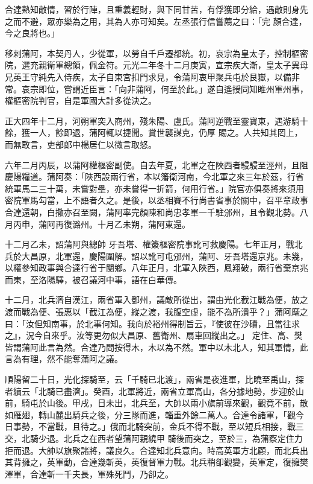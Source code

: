\begin{pinyinscope}
 合達熟知敵情，習於行陣，且重義輕財，與下同甘苦，有俘獲即分給，遇敵則身先之而不避，眾亦樂為之用，其為人亦可知矣。左丞張行信嘗薦之曰：「完
 顏合達，今之良將也。」



 移剌蒲阿，本契丹人，少從軍，以勞自千戶遷都統。初，哀宗為皇太子，控制樞密院，選充親衛軍總領，佩金符。元光二年冬十二月庚寅，宣宗疾大漸，皇太子異母兄英王守純先入侍疾，太子自東宮扣門求見，令蒲阿衷甲聚兵屯於艮嶽，以備非常。哀宗即位，嘗謂近臣言：「向非蒲阿，何至於此。」遂自遙授同知睢州軍州事，權樞密院判官，自是軍國大計多從決之。



 正大四年十二月，河朔軍突入商州，殘朱陽、盧氏。蒲阿逆戰至靈寶東，遇游騎十餘，獲一人，餘即退，蒲阿輒以捷聞。賞世襲謀克，仍厚
 賜之。人共知其罔上，而無敢言，吏部郎中楊居仁以微言取怒。



 六年二月丙辰，以蒲阿權樞密副使。自去年夏，北軍之在陜西者駸駸至涇州，且阻慶陽糧道。蒲阿奏：「陜西設兩行省，本以籓衛河南，今北軍之來三年於茲，行省統軍馬二三十萬，未嘗對壘，亦未嘗得一折箭，何用行省。」院官亦俱奏將來須用密院軍馬勾當，上不語者久之。是後，以丞相賽不行尚書省事於關中，召平章政事合達還朝，白撒亦召至闕，蒲阿率完顏陳和尚忠孝軍一千駐邠州，且令觀北勢。八月丙申，蒲阿再復潞州。十月乙未朔，蒲阿東還。



 十二月乙未，詔蒲阿與總帥
 牙吾塔、權簽樞密院事訛可救慶陽。七年正月，戰北兵於大昌原，北軍還，慶陽圍解。詔以訛可屯邠州，蒲阿、牙吾塔還京兆。未幾，以權參知政事與合達行省于閿鄉。八年正月，北軍入陜西，鳳翔破，兩行省棄京兆而東，至洛陽驛，被召議河中事，語在白華傳。



 十二月，北兵濟自漢江，兩省軍入鄧州，議敵所從出，謂由光化截江戰為便，放之渡而戰為便、張惠以「截江為便，縱之渡，我腹空虛，能不為所潰乎？」蒲阿麾之曰：「汝但知南事，於北事何知。我向於裕州得制旨云，『使彼在沙磧，且當往求之』，況今自來乎。汝等更勿似大昌原、舊衛州、扇車回縱出之。」
 定住、高、樊皆謂蒲阿此言為然。合達乃問按得木，木以為不然。軍中以木北人，知其軍情，此言為有理，然不能奪蒲阿之議。



 順陽留二十日，光化探騎至，云「千騎已北渡」，兩省是夜進軍，比曉至禹山，探者續云「北騎已盡濟」。癸酉，北軍將近，兩省立軍高山，各分據地勢，步迎於山前，騎屯於山後。甲戌，日未出，北兵至，大帥以兩小旗前導來觀，觀竟不前，散如雁翅，轉山麓出騎兵之後，分三隊而進，輜重外餘二萬人。合達令諸軍，「觀今日事勢，不當戰，且待之。」俄而北騎突前，金兵不得不戰，至以短兵相接，戰三交，北騎少退。北兵之在西者望蒲阿親繞甲
 騎後而突之，至於三，為蒲察定住力拒而退。大帥以旗聚諸將，議良久。合達知北兵意向。時高英軍方北顧，而北兵出其背擁之，英軍動，合達幾斬英，英復督軍力戰。北兵稍卻觀變，英軍定，復擁樊澤軍，合達斬一千夫長，軍殊死鬥，乃卻之。




\end{pinyinscope}

